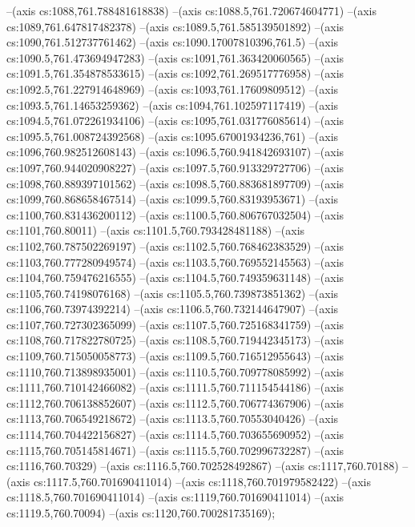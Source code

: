 --(axis cs:1088,761.788481618838)
--(axis cs:1088.5,761.720674604771)
--(axis cs:1089,761.647817482378)
--(axis cs:1089.5,761.585139501892)
--(axis cs:1090,761.512737761462)
--(axis cs:1090.17007810396,761.5)
--(axis cs:1090.5,761.473694947283)
--(axis cs:1091,761.363420060565)
--(axis cs:1091.5,761.354878533615)
--(axis cs:1092,761.269517776958)
--(axis cs:1092.5,761.227914648969)
--(axis cs:1093,761.17609809512)
--(axis cs:1093.5,761.14653259362)
--(axis cs:1094,761.102597117419)
--(axis cs:1094.5,761.072261934106)
--(axis cs:1095,761.031776085614)
--(axis cs:1095.5,761.008724392568)
--(axis cs:1095.67001934236,761)
--(axis cs:1096,760.982512608143)
--(axis cs:1096.5,760.941842693107)
--(axis cs:1097,760.944020908227)
--(axis cs:1097.5,760.913329727706)
--(axis cs:1098,760.889397101562)
--(axis cs:1098.5,760.883681897709)
--(axis cs:1099,760.868658467514)
--(axis cs:1099.5,760.83193953671)
--(axis cs:1100,760.831436200112)
--(axis cs:1100.5,760.806767032504)
--(axis cs:1101,760.80011)
--(axis cs:1101.5,760.793428481188)
--(axis cs:1102,760.787502269197)
--(axis cs:1102.5,760.768462383529)
--(axis cs:1103,760.777280949574)
--(axis cs:1103.5,760.769552145563)
--(axis cs:1104,760.759476216555)
--(axis cs:1104.5,760.749359631148)
--(axis cs:1105,760.74198076168)
--(axis cs:1105.5,760.739873851362)
--(axis cs:1106,760.73974392214)
--(axis cs:1106.5,760.732144647907)
--(axis cs:1107,760.727302365099)
--(axis cs:1107.5,760.725168341759)
--(axis cs:1108,760.717822780725)
--(axis cs:1108.5,760.719442345173)
--(axis cs:1109,760.715050058773)
--(axis cs:1109.5,760.716512955643)
--(axis cs:1110,760.713898935001)
--(axis cs:1110.5,760.709778085992)
--(axis cs:1111,760.710142466082)
--(axis cs:1111.5,760.711154544186)
--(axis cs:1112,760.706138852607)
--(axis cs:1112.5,760.706774367906)
--(axis cs:1113,760.706549218672)
--(axis cs:1113.5,760.70553040426)
--(axis cs:1114,760.704422156827)
--(axis cs:1114.5,760.703655690952)
--(axis cs:1115,760.705145814671)
--(axis cs:1115.5,760.702996732287)
--(axis cs:1116,760.70329)
--(axis cs:1116.5,760.702528492867)
--(axis cs:1117,760.70188)
--(axis cs:1117.5,760.701690411014)
--(axis cs:1118,760.701979582422)
--(axis cs:1118.5,760.701690411014)
--(axis cs:1119,760.701690411014)
--(axis cs:1119.5,760.70094)
--(axis cs:1120,760.700281735169);

